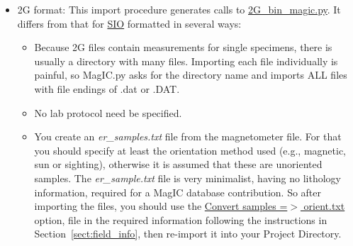 \documentclass[11pt]{book}
\begin{document}
{\begin{itemize}
\begin{itemize}
		You should also check one of the lab protocols you used. 
		\begin{itemize}
		\item  If these data were ARMs,  check the AF box and fill in the peak AF and dc field values to the right.  If the lab field direction was not along -Z, then fill in what it was.  
		\item  If the data included TRMs from a Thellier or TRM anisotropy experiment, fill in the DC field and orientation (but not the peak AF field.) 
		\item If the data were for a TRM acquisition experiment, check the TRM box (but not the 'T' box).
		\item  If these data were part of an anisotropy experiment, check the 'ANI' box and the appropriate AF, T, I box for the type of remanence anisotropy experiment it was.  
		\item If the data were IRMs check that box.  If the treatment values were in volts on an ASC impulse coil, give the coil number (1,2, or 3) in the appropriate box.  
		\item If the data were part of a Lowrie 3D-IRM experiment (Lowrie, 1990),  \nocite{lowrie90} then check that box.
		\end{itemize}
	\end{itemize}
	\item 2G format:   This import procedure generates calls to \href{#2G_bin_magic.py}{2G\_bin\_magic.py}.  It  differs from that for \href{#SIO}{SIO} formatted in several ways:
	\begin{itemize}
	\item Because 2G  files contain measurements for single specimens, there is usually a directory with many files.  Importing each file individually is painful, so MagIC.py asks for the directory name and imports ALL files with file endings of .dat or .DAT.   
	\item No lab protocol need be specified.
	\item You create an {\it er\_samples.txt} file from the magnetometer file.  For that you should specify at least the orientation method used (e.g., magnetic, sun or sighting), otherwise it is assumed that these are unoriented samples.  The {\it er\_sample.txt} file is very minimalist, having no lithology information, required for a MagIC database contribution.  So after importing the files, you should use the \href{#samp2orient}{Convert samples =$>$ orient.txt} option, file in the required information following the instructions in Section~\ref{sect:field_info}, then re-import it into your Project Directory.
	\end{itemize}


\end{itemize}}
\end{document}
